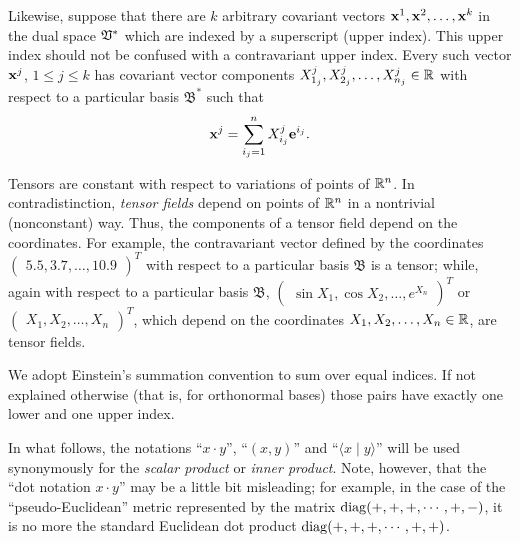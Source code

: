 Likewise, suppose that there are $k$ arbitrary covariant vectors ${\bf x}^1,{\bf x}^2,\ldots ,{\bf x}^k$ in the dual space ${\frak V}^\ast$ which are indexed by a superscript
(upper index). This upper index should not  be confused with a contravariant upper index.
Every such vector ${\bf x}^j$, $1 \le j \le k$ has covariant vector components
$X_{1_j}^j, X_{2_j}^j, \ldots , X_{n_j}^j \in {\Bbb R}$
with respect to a particular basis ${\mathfrak B}^\ast$
such that
\begin{equation}
{\bf x}^j =\sum_{{i_j}=1}^n X_{i_j}^j{\bf e}^{{i_j}}.
\label{2016-m-tensor-covvs}
\end{equation}

Tensors are constant with respect to variations of points of ${\Bbb R}^n$.
In contradistinction, {\em tensor fields} depend on points of ${\Bbb R}^n$ in a nontrivial (nonconstant) way.
Thus, the components of a tensor field
depend on the coordinates.
{
\color{blue}
\bexample
For example, the contravariant vector defined by the coordinates
$
\begin{pmatrix}
5.5,
3.7,
\ldots ,
10.9
\end{pmatrix}^T
$
with respect to a particular basis ${\mathfrak B}$
is a tensor; while, again with respect to a particular basis ${\mathfrak B}$,
$
\begin{pmatrix}
\sin X_1,
\cos X_2,
\ldots ,
e^{X_n}
\end{pmatrix}^T
$ or
$
\begin{pmatrix}
X_1,
X_2,
\ldots ,
X_n
\end{pmatrix}^T
$,
which depend on the coordinates $X_1, X_2, \ldots , X_n \in {\Bbb R}$,
are tensor fields.
\eexample
}


We adopt Einstein's summation convention to sum over equal indices.
If not explained otherwise (that is, for orthonormal bases) those pairs have exactly one lower and one upper index.


In what follows, the notations
``$x\cdot y$'',
``$(x,y)$'' and
``$\langle x\mid y\rangle $'' will be used synonymously for the {\em
scalar product}
or
{\em inner product}.
Note, however, that the ``dot notation $x\cdot y$''
may be a little bit misleading; for example, in the case of the ``pseudo-Euclidean'' metric
represented by the matrix
 ${\rm diag}(+,+,+,\cdots ,+,-)$, it is no more the standard Euclidean dot product
${\rm diag}(+,+,+,\cdots ,+,+)$.



